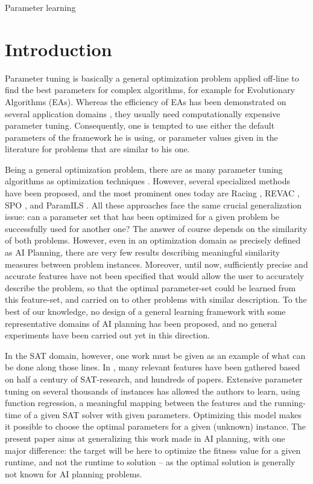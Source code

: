 \documentclass{MYsig-alternate}
\begin{document}
 {Parameter learning}





\section{Introduction}

Parameter tuning is basically a general optimization problem applied off-line to find the best parameters for complex algorithms, for example for Evolutionary Algorithms (EAs). Whereas the efficiency of EAs has been demonstrated on several application domains \cite{practice08,ParameterSettingBook07}, they usually need computationally expensive parameter tuning. Consequently, one is tempted to use either the default parameters of the framework he is using, or parameter values given in the literature for problems that are similar to his one. 

Being a general optimization problem, there are as many parameter tuning algorithms as optimization techniques \cite{Eiben2007,Montero:2010}. However, several specialized methods have been proposed, and the most prominent ones today are Racing \cite{birattari2002}, REVAC \cite{Nannen07}, SPO \cite{SPO:CEC05}, and ParamILS \cite{ParamILS-JAIR}. All these approaches face the same crucial generalization issue: can a parameter set that has been optimized for a given problem be successfully used for another one? The answer of course depends on the similarity of both problems. However, even in an optimization domain as precisely defined as AI Planning, there are very few results describing meaningful similarity measures between problem instances. Moreover, until now, sufficiently precise and accurate features have not been specified that would allow the user to accurately describe the problem, so that the optimal parameter-set could be learned from this feature-set, and carried on to other problems with similar description. To the best of our knowledge, no design of a general learning framework with some representative domains of AI planning has been proposed, and no general experiments have been carried out yet in this direction.

In the SAT domain, however, one work must be given as an example of what can be done along those lines. In \cite{Hutter06}, many relevant features have been gathered based on half a century of SAT-research, and hundreds of papers. Extensive parameter tuning on several thousands of instances has allowed the authors to learn, using function regression, a meaningful mapping between the features and the running-time of a given SAT solver with given parameters. Optimizing this model makes it possible to choose the optimal parameters for a given (unknown) instance. The present paper aims at generalizing this work made in AI planning, with one major difference: the target will be here to optimize the fitness value for a given runtime, and not the runtime to solution -- as the optimal solution is generally not known for AI planning problems. 
\end{document}
